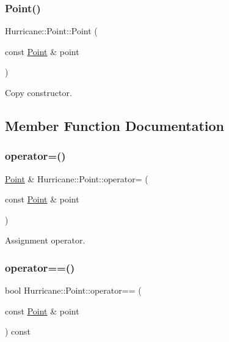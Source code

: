\subsubsection{\texorpdfstring{Point()}{Point()}\hspace{0.1cm}{\footnotesize\ttfamily [3/3]}}
{\footnotesize\ttfamily Hurricane\+::\+Point\+::\+Point (\begin{DoxyParamCaption}\item[{const \hyperlink{classHurricane_1_1Point}{Point} \&}]{point }\end{DoxyParamCaption})}

Copy constructor. 

\subsection{Member Function Documentation}
\mbox{\label{classHurricane_1_1Point_ae3e33361927744a483d97cb7d182a1d6}} 
\subsubsection{\texorpdfstring{operator=()}{operator=()}}
{\footnotesize\ttfamily \hyperlink{classHurricane_1_1Point}{Point} \& Hurricane\+::\+Point\+::operator= (\begin{DoxyParamCaption}\item[{const \hyperlink{classHurricane_1_1Point}{Point} \&}]{point }\end{DoxyParamCaption})}

Assignment operator. \mbox{\label{classHurricane_1_1Point_a2aeb5fe96fbe9324dcbc90d41ad70fb9}} 
\subsubsection{\texorpdfstring{operator==()}{operator==()}}
{\footnotesize\ttfamily bool Hurricane\+::\+Point\+::operator== (\begin{DoxyParamCaption}\item[{const \hyperlink{classHurricane_1_1Point}{Point} \&}]{point }\end{DoxyParamCaption}) const}

